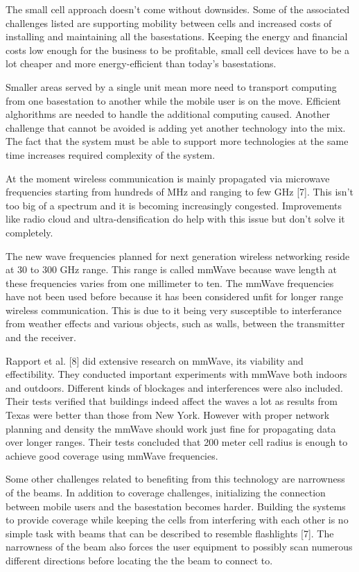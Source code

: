 \documentclass[conference]{IEEEtran}
\begin{document}
\par
The small cell approach doesn't come without downsides. Some of the associated challenges listed are supporting mobility between cells and increased costs of installing and maintaining all the basestations. Keeping the energy and financial costs low enough for the business to be profitable, small cell devices have to be a lot cheaper and more energy-efficient than today's basestations.
\par
Smaller areas served by a single unit mean more need to transport computing from one basestation to another while the mobile user is on the move. Efficient alghorithms are needed to handle the additional computing caused. Another challenge that cannot be avoided is adding yet another technology into the mix. The fact that the system must be able to support more technologies at the same time increases required complexity of the system.
\par
At the moment wireless communication is mainly propagated via microwave frequencies starting from hundreds of MHz and ranging to few GHz [7]. This isn't too big of a spectrum and it is becoming increasingly congested. Improvements like radio cloud and ultra-densification do help with this issue but don't solve it completely.
\par
The new wave frequencies planned for next generation wireless networking reside at 30 to 300 GHz range. This range is called mmWave because wave length at these frequencies varies from one millimeter to ten. The mmWave frequencies have not been used before because it has been considered unfit for longer range wireless communication. This is due to it being very susceptible to interferance from weather effects and various objects, such as walls, between the transmitter and the receiver.
\par
Rapport et al. [8] did extensive research on mmWave, its viability and effectibility. They conducted important experiments with mmWave both indoors and outdoors. Different kinds of blockages and interferences were also included. Their tests verified that buildings indeed affect the waves a lot as results from Texas were better than those from New York. However with proper network planning and density the mmWave should work just fine for propagating data over longer ranges. Their tests concluded that 200 meter cell radius is enough to achieve good coverage using mmWave frequencies.
\par
Some other challenges related to benefiting from this technology are narrowness of the beams. In addition to coverage challenges, initializing the connection between mobile users and the basestation becomes harder. Building the systems to provide coverage while keeping the cells from interfering with each other is no simple task with beams that can be described to resemble flashlights [7]. The narrowness of the beam also forces the user equipment to possibly scan numerous different directions before locating the the beam to connect to.
\end{document}
